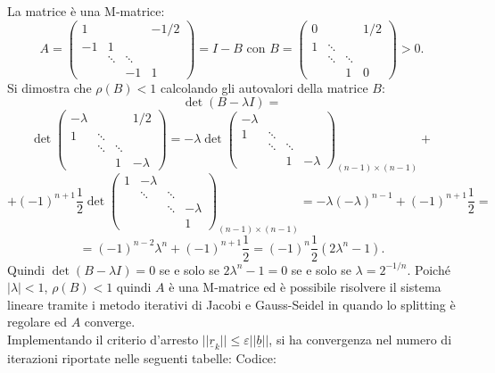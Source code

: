   \begin{sol}
        \normalfont
        La matrice è una M-matrice:$$A=\begin{pmatrix}1&&&-1/2\\-1&1&&\\&\ddots&\ddots&\\&&-1&1\end{pmatrix}=I-B\mbox{ con }B=\begin{pmatrix}0&&&1/2\\1&\ddots&&\\&\ddots&\ddots&\\&&1&0\end{pmatrix}>0.$$
        Si dimostra che $\rho(B)<1$ calcolando gli autovalori della matrice $B$:
        $$\det(B-\lambda I)=$$ $$\det\begin{pmatrix}-\lambda&&&1/2\\1&\ddots&&\\&\ddots&\ddots&\\&&1&-\lambda\end{pmatrix}=-\lambda\det\begin{pmatrix}-\lambda&&&\\1&\ddots&&\\&\ddots&\ddots&\\&&1&-\lambda\end{pmatrix}_{(n-1)\times (n-1)}+$$ $$+(-1)^{n+1}\frac{1}{2}\det\begin{pmatrix}1&-\lambda &&\\&\ddots&\ddots&\\&&\ddots&-\lambda\\&&&1\end{pmatrix}_{(n-1)\times (n-1)} = -\lambda(-\lambda)^{n-1}+(-1)^{n+1}\frac{1}{2}=$$$$=(-1)^{n-2}\lambda^n+(-1)^{n+1}\frac{1}{2}=(-1)^n\frac{1}{2}(2\lambda^n-1).$$
        Quindi $\det(B-\lambda I)=0$ se e solo se $2\lambda^n-1=0$ se e solo se $\lambda=2^{-1/n}$. Poiché
        $|\lambda|<1$, $\rho(B)<1$ quindi $A$ è una M-matrice ed è possibile risolvere il sistema lineare tramite i metodo iterativi
        di Jacobi e Gauss-Seidel in quando lo splitting è regolare ed $A$ converge.\\
        Implementando il criterio d'arresto $||\underline{r}_k||\leq\varepsilon||\underline{b}||$, si ha convergenza nel numero di iterazioni riportate nelle seguenti tabelle:
        Codice:\\
        
        \vspace{0.5em}

\end{sol}
